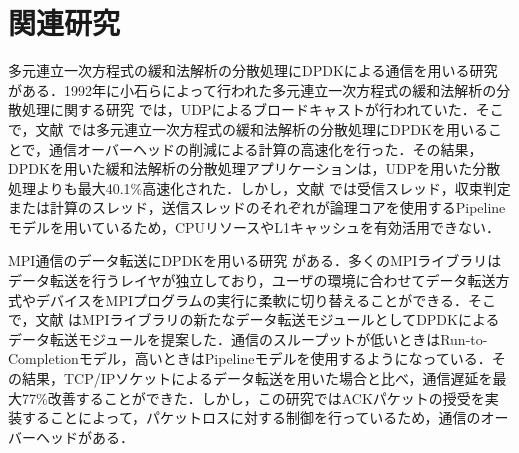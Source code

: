 \section{関連研究}
\label{sec:RelatedWorks}
多元連立一次方程式の緩和法解析の分散処理にDPDKによる通信を用いる研究 \cite{RelaxationMethodDPDK} がある．1992年に小石らによって行われた多元連立一次方程式の緩和法解析の分散処理に関する研究 \cite{RelaxationMethodUDP} では，UDPによるブロードキャストが行われていた．そこで，文献 \cite{RelaxationMethodDPDK} では多元連立一次方程式の緩和法解析の分散処理にDPDKを用いることで，通信オーバーヘッドの削減による計算の高速化を行った．その結果，DPDKを用いた緩和法解析の分散処理アプリケーションは，UDPを用いた分散処理よりも最大40.1\%高速化された．しかし，文献 \cite{RelaxationMethodDPDK} では受信スレッド，収束判定または計算のスレッド，送信スレッドのそれぞれが論理コアを使用するPipelineモデルを用いているため，CPUリソースやL1キャッシュを有効活用できない．

MPI通信のデータ転送にDPDKを用いる研究 \cite{MPIDPDK} がある．多くのMPIライブラリはデータ転送を行うレイヤが独立しており，ユーザの環境に合わせてデータ転送方式やデバイスをMPIプログラムの実行に柔軟に切り替えることができる．そこで，文献 \cite{MPIDPDK} はMPIライブラリの新たなデータ転送モジュールとしてDPDKによるデータ転送モジュールを提案した．通信のスループットが低いときはRun-to-Completionモデル，高いときはPipelineモデルを使用するようになっている．その結果，TCP/IPソケットによるデータ転送を用いた場合と比べ，通信遅延を最大77\%改善することができた．しかし，この研究ではACKパケットの授受を実装することによって，パケットロスに対する制御を行っているため，通信のオーバーヘッドがある．
